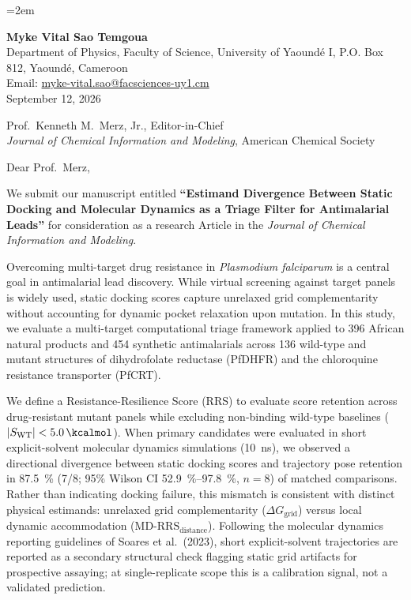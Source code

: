 \documentclass[11pt,letterpaper]{article}
\begin{document}
\emergencystretch=2em

\begin{flushleft}
\textbf{Myke Vital Sao Temgoua} \\
Department of Physics, Faculty of Science, University of Yaound\'{e} I, P.O. Box 812, Yaound\'{e}, Cameroon \\
Email: \href{mailto:myke-vital.sao@facsciences-uy1.cm}{myke-vital.sao@facsciences-uy1.cm} \\[0.6em]
September 12, 2026
\end{flushleft}

\begin{flushleft}
Prof.\ Kenneth M.\ Merz, Jr., Editor-in-Chief \\
\textit{Journal of Chemical Information and Modeling}, American Chemical Society
\end{flushleft}

\vspace{0.3em}

\noindent Dear Prof.\ Merz,

We submit our manuscript entitled \textbf{``Estimand Divergence Between Static Docking and Molecular Dynamics as a Triage Filter for Antimalarial Leads''} for consideration as a research Article in the \textit{Journal of Chemical Information and Modeling}.

Overcoming multi-target drug resistance in \textit{Plasmodium falciparum} is a central goal in antimalarial lead discovery. While virtual screening against target panels is widely used, static docking scores capture unrelaxed grid complementarity without accounting for dynamic pocket relaxation upon mutation. In this study, we evaluate a multi-target computational triage framework applied to 396 African natural products and 454 synthetic antimalarials across 136 wild-type and mutant structures of dihydrofolate reductase (PfDHFR) and the chloroquine resistance transporter (PfCRT).

We define a Resistance-Resilience Score (RRS) to evaluate score retention across drug-resistant mutant panels while excluding non-binding wild-type baselines ($|S_{\mathrm{WT}}| < \qty{5.0}{\kcalmol}$). When primary candidates were evaluated in short explicit-solvent molecular dynamics simulations (\qty{10}{\ns}), we observed a directional divergence between static docking scores and trajectory pose retention in \qty{87.5}{\percent} (7/8; 95\% Wilson CI \qtyrange{52.9}{97.8}{\percent}, $n=\num{8}$) of matched comparisons. Rather than indicating docking failure, this mismatch is consistent with distinct physical estimands: unrelaxed grid complementarity ($\Delta G_{\mathrm{grid}}$) versus local dynamic accommodation ($\mathrm{MD\text{-}RRS}_{\mathrm{distance}}$). Following the molecular dynamics reporting guidelines of Soares et al.\ (2023), short explicit-solvent trajectories are reported as a secondary structural check flagging static grid artifacts for prospective assaying; at single-replicate scope this is a calibration signal, not a validated prediction.
\end{document}
